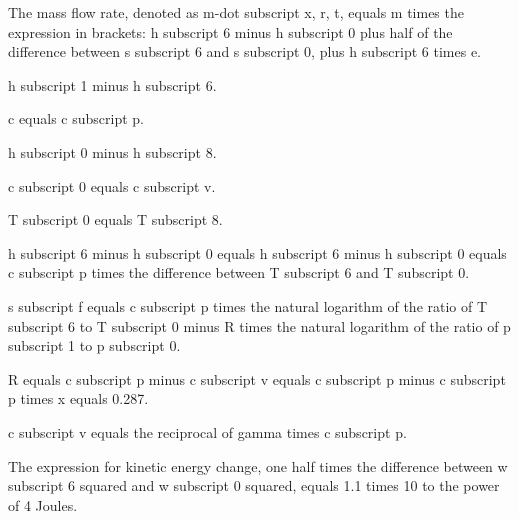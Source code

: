 The mass flow rate, denoted as m-dot subscript x, r, t, equals m times the expression in brackets: h subscript 6 minus h subscript 0 plus half of the difference between s subscript 6 and s subscript 0, plus h subscript 6 times e.

h subscript 1 minus h subscript 6.

c equals c subscript p.

h subscript 0 minus h subscript 8.

c subscript 0 equals c subscript v.

T subscript 0 equals T subscript 8.

h subscript 6 minus h subscript 0 equals h subscript 6 minus h subscript 0 equals c subscript p times the difference between T subscript 6 and T subscript 0.

s subscript f equals c subscript p times the natural logarithm of the ratio of T subscript 6 to T subscript 0 minus R times the natural logarithm of the ratio of p subscript 1 to p subscript 0.

R equals c subscript p minus c subscript v equals c subscript p minus c subscript p times x equals 0.287.

c subscript v equals the reciprocal of gamma times c subscript p.

The expression for kinetic energy change, one half times the difference between w subscript 6 squared and w subscript 0 squared, equals 1.1 times 10 to the power of 4 Joules.